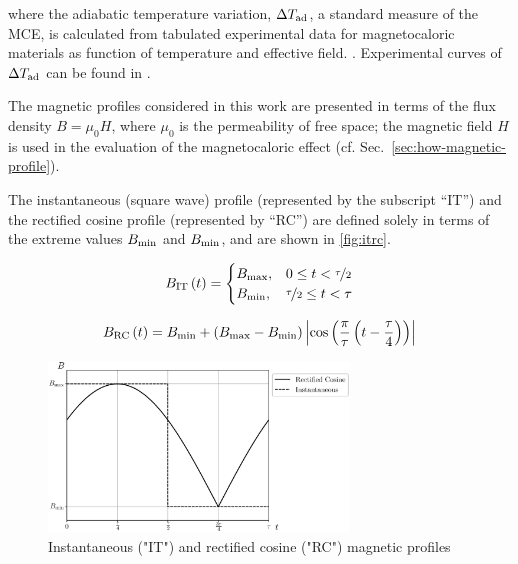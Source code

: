 \documentclass[referee]{svjour3}
\begin{document}

\noindent where the adiabatic temperature variation, $\Delta{}T_{\mathrm{ad}}$, a standard measure of the MCE, is calculated from tabulated experimental data for magnetocaloric materials as function of temperature and effective field. \cite{bib:trevizoli16_perfor_model}. Experimental curves of $\Delta{}T_{\mathrm{ad}}$ can be found in \cite{bib:bahl09}.

The magnetic profiles considered in this work are presented in terms of the flux density $B = \mu_0 H$, where $\mu_0$ is the permeability of free space; the magnetic field $H$ is used in the evaluation of the magnetocaloric effect (cf. Sec.~\ref{sec:how-magnetic-profile}).



The instantaneous (square wave) profile (represented by the subscript ``IT'') and the rectified cosine profile (represented by ``RC'') are defined solely in terms of the extreme values $B_{\mathrm{min}}$ and $B_{\mathrm{min}}$, and are shown in \autoref{fig:itrc}.


\begin{equation}
{B}_{\mathrm{IT}}\,(t)=
\begin{cases}
{B}_{\mathrm{max}}, & 0 \le t < \nicefrac{\tau}{2} \\
{B}_{\mathrm{min}}, & \nicefrac{\tau}{2} \le t < \tau\\
\end{cases}
\label{eq:199}
\end{equation}

\begin{equation}
{B}_{\mathrm{RC}}\,(t) = B_{\mathrm{min}} + \left(B_{\mathrm{max}} - B_{\mathrm{min}}\right)  \left\lvert \cos\left( \frac{\pi}{\tau} \left( t - \frac{\tau}{4}\right)\right) \right\rvert
\label{eq:200}
\end{equation}

\begin{figure}[!ht]
  \centering
  \includegraphics[width=8cm]{Fig3-profiles_it_and_rc}
  \caption{Instantaneous ("IT") and rectified cosine ("RC") magnetic profiles}
  \label{fig:itrc}
\end{figure}
\end{document}
